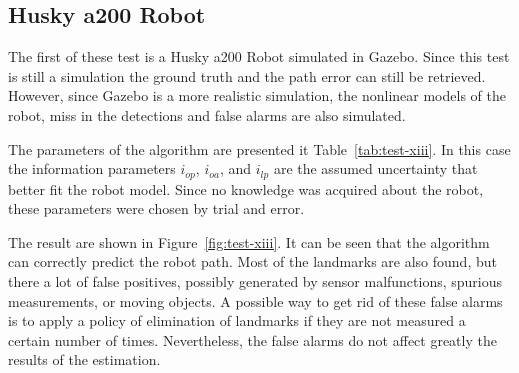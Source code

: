 \subsection{Husky a200 Robot}

The first of these test is a Husky a200 Robot simulated in Gazebo. Since this test is still a simulation the ground truth and the path error can still be retrieved. However, since Gazebo is a more realistic simulation, the nonlinear models of the robot, miss in the detections and false alarms are also simulated. 

The parameters of the algorithm are presented it Table~\ref{tab:test-xiii}. In this case the information parameters $i_{op}$, $i_{oa}$, and $i_{lp}$ are the assumed uncertainty that better fit the robot model. Since no knowledge was acquired about the robot, these parameters were chosen by trial and error. 

The result are shown in Figure~\ref{fig:test-xiii}. It can be seen that the algorithm can correctly predict the robot path. Most of the landmarks are also found, but there a lot of false positives, possibly generated by sensor malfunctions, spurious measurements, or moving objects. A possible way to get rid of these false alarms is to apply a policy of elimination of landmarks if they are not measured a certain number of times. Nevertheless, the false alarms do not affect greatly the results of the estimation.

